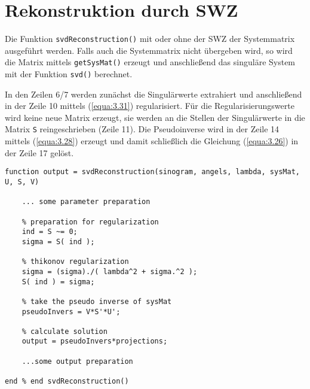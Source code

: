 \section{Rekonstruktion durch SWZ}
\label{cha:A.6}

Die Funktion \verb|svdReconstruction()| mit oder ohne der SWZ der Systemmatrix ausgeführt werden. Falls auch die Systemmatrix nicht übergeben wird, so wird die Matrix mittels \verb|getSysMat()| erzeugt und anschließend das singuläre System mit der \MATLAB Funktion \verb|svd()| berechnet.

In den Zeilen 6/7 werden zunächst die Singulärwerte extrahiert und anschließend in der Zeile 10 mittels (\ref{equa:3.31}) regularisiert. Für die Regularisierungswerte wird keine neue Matrix erzeugt, sie werden an die Stellen der Singulärwerte in die Matrix \verb|S| reingeschrieben (Zeile 11). Die Pseudoinverse wird in der Zeile 14 mittels (\ref{equa:3.28}) erzeugt und damit schließlich die Gleichung (\ref{equa:3.26}) in der Zeile 17 gelöst.

\begin{lstlisting}[style=Matlab-editor,basicstyle=\color{black}\ttfamily\footnotesize, backgroundcolor=\color{white}]
function output = svdReconstruction(sinogram, angels, lambda, sysMat, U, S, V)
	
	... some parameter preparation
	
	% preparation for regularization
	ind = S ~= 0;    
	sigma = S( ind );
	
	% thikonov regularization
	sigma = (sigma)./( lambda^2 + sigma.^2 );
	S( ind ) = sigma;
	
	% take the pseudo inverse of sysMat
	pseudoInvers = V*S'*U';
	
	% calculate solution
	output = pseudoInvers*projections;
	
	...some output preparation
	
end % end svdReconstruction()
\end{lstlisting}

